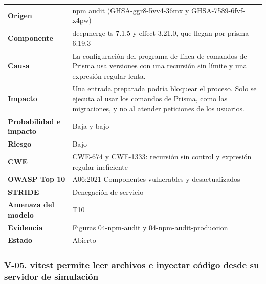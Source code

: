 \documentclass[12pt, letterpaper]{article}
\begin{document}
\begingroup\small\setlength{\tabcolsep}{4pt}\renewcommand{\arraystretch}{1.25}
\begin{longtable}{L{0.24}L{0.70}}
\toprule
\endfirsthead
\toprule
\endhead
\bottomrule
\endfoot
\textbf{Origen} & npm audit (GHSA-ggr8-5vv4-36mx y GHSA-7589-6fvf-x4pw) \\
\textbf{Componente} & deepmerge-ts 7.1.5 y effect 3.21.0, que llegan por prisma 6.19.3 \\
\textbf{Causa} & La configuración del programa de línea de comandos de Prisma usa versiones con una recursión sin límite y una expresión regular lenta. \\
\textbf{Impacto} & Una entrada preparada podría bloquear el proceso. Solo se ejecuta al usar los comandos de Prisma, como las migraciones, y no al atender peticiones de los usuarios. \\
\textbf{Probabilidad e impacto} & Baja y bajo \\
\textbf{Riesgo} & Bajo \\
\textbf{CWE} & CWE-674 y CWE-1333: recursión sin control y expresión regular ineficiente \\
\textbf{OWASP Top 10} & A06:2021 Componentes vulnerables y desactualizados \\
\textbf{STRIDE} & Denegación de servicio \\
\textbf{Amenaza del modelo} & T10 \\
\textbf{Evidencia} & Figuras 04-npm-audit y 04-npm-audit-produccion \\
\textbf{Estado} & Abierto \\
\end{longtable}
\endgroup

\subsubsection*{V-05. vitest permite leer archivos e inyectar código desde su servidor de simulación}
\end{document}
